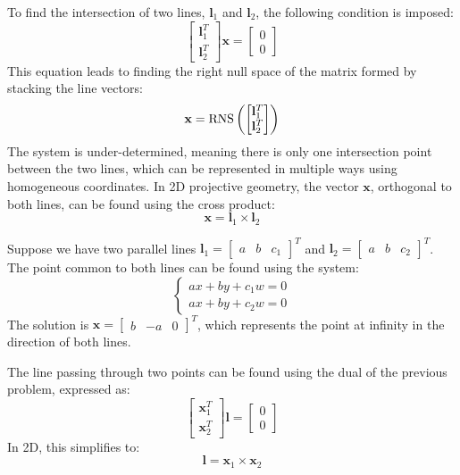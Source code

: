 To find the intersection of two lines, $\mathbf{l}_1$ and $\mathbf{l}_2$, the following condition is imposed:
\[\begin{bmatrix} \mathbf{l}_1^T \\ \mathbf{l}_2^T \end{bmatrix} \mathbf{x} = \begin{bmatrix} 0 \\ 0 \end{bmatrix}\]
This equation leads to finding the right null space of the matrix formed by stacking the line vectors:
\[\mathbf{x}=\textnormal{RNS}\left(\begin{bmatrix}\mathbf{l}_1^T \\ \mathbf{l}_2^T \end{bmatrix} \right)\]
The system is under-determined, meaning there is only one intersection point between the two lines, which can be represented in multiple ways using homogeneous coordinates.
In 2D projective geometry, the vector $\mathbf{x}$, orthogonal to both lines, can be found using the cross product:
\[\mathbf{x}=\mathbf{l}_1 \times \mathbf{l}_2\]
\begin{example}
    Suppose we have two parallel lines $\mathbf{l}_1={\begin{bmatrix} a & b & c_1 \end{bmatrix}}^T$ and $\mathbf{l}_2={\begin{bmatrix} a & b & c_2 \end{bmatrix}}^T$. 
    The point common to both lines can be found using the system:
        \[\begin{cases}
        ax+by+c_1w=0 \\
        ax+by+c_2w=0
    \end{cases}\]
    The solution is $\mathbf{x}=\begin{bmatrix} b & -a & 0 \end{bmatrix}^T$, which represents the point at infinity in the direction of both lines.
\end{example}
The line passing through two points can be found using the dual of the previous problem, expressed as:
\[\begin{bmatrix} \mathbf{x}_1^T \\ \mathbf{x}_2^T \end{bmatrix} \mathbf{l} = \begin{bmatrix} 0 \\ 0 \end{bmatrix}\]
In 2D, this simplifies to: 
\[\mathbf{l}=\mathbf{x}_1 \times \mathbf{x}_2\] 
